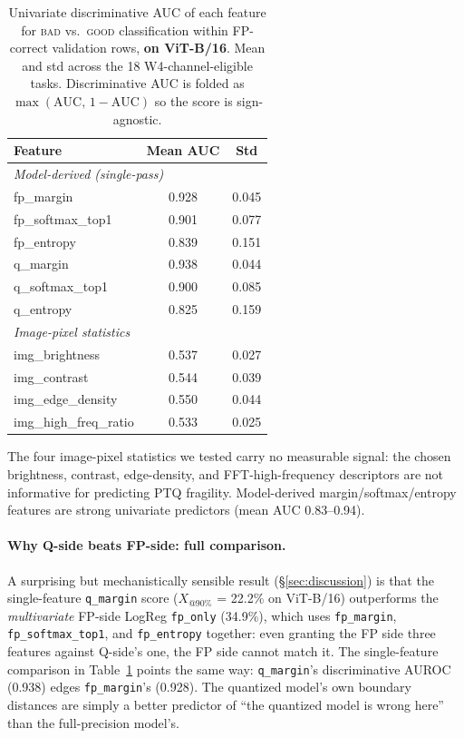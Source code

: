 \documentclass{article}
\makeatletter
\newcommand{\fp}{\textsc{FP}\xspace}
\newcommand{\ptq}{\textsc{PTQ}\xspace}
\newcommand{\good}{\textsc{good}\xspace}
\newcommand{\bad}{\textsc{bad}\xspace}
\newcommand{\xat}[1]{\ensuremath{X_{@#1\%}}}
\makeatother
\begin{document}
\begin{table}[t]
\centering
\caption{Univariate discriminative AUC of each feature for \bad{} vs.\ \good{} classification within FP-correct validation rows, \textbf{on ViT-B/16}. Mean and std across the 18 W4-channel-eligible tasks. Discriminative AUC is folded as $\max(\mathrm{AUC},\,1-\mathrm{AUC})$ so the score is sign-agnostic.}
\label{tab:univariate}
\small
\begin{tabular}{lcc}
\toprule
Feature & Mean AUC & Std \\
\midrule
\multicolumn{3}{l}{\textit{Model-derived (single-pass)}} \\
fp\_margin              & 0.928 & 0.045 \\
fp\_softmax\_top1       & 0.901 & 0.077 \\
fp\_entropy             & 0.839 & 0.151 \\
q\_margin               & 0.938 & 0.044 \\
q\_softmax\_top1        & 0.900 & 0.085 \\
q\_entropy              & 0.825 & 0.159 \\
\midrule
\multicolumn{3}{l}{\textit{Image-pixel statistics}} \\
img\_brightness         & 0.537 & 0.027 \\
img\_contrast           & 0.544 & 0.039 \\
img\_edge\_density      & 0.550 & 0.044 \\
img\_high\_freq\_ratio  & 0.533 & 0.025 \\
\bottomrule
\end{tabular}
\end{table}

The four image-pixel statistics we tested carry no measurable signal: the chosen brightness, contrast, edge-density, and FFT-high-frequency descriptors are not informative for predicting \ptq{} fragility. Model-derived margin/softmax/entropy features are strong univariate predictors (mean AUC 0.83--0.94).

\paragraph{Why Q-side beats FP-side: full comparison.}
A surprising but mechanistically sensible result (\S\ref{sec:discussion}) is that the single-feature \texttt{q\_margin} score (\xat{90} = 22.2\% on ViT-B/16) outperforms the \emph{multivariate} FP-side LogReg \texttt{fp\_only} (34.9\%), which uses \texttt{fp\_margin}, \texttt{fp\_softmax\_top1}, and \texttt{fp\_entropy} together: even granting the \fp{} side three features against Q-side's one, the \fp{} side cannot match it. The single-feature comparison in Table~\ref{tab:univariate} points the same way: \texttt{q\_margin}'s discriminative AUROC (0.938) edges \texttt{fp\_margin}'s (0.928). The quantized model's own boundary distances are simply a better predictor of ``the quantized model is wrong here'' than the full-precision model's.
\end{document}
